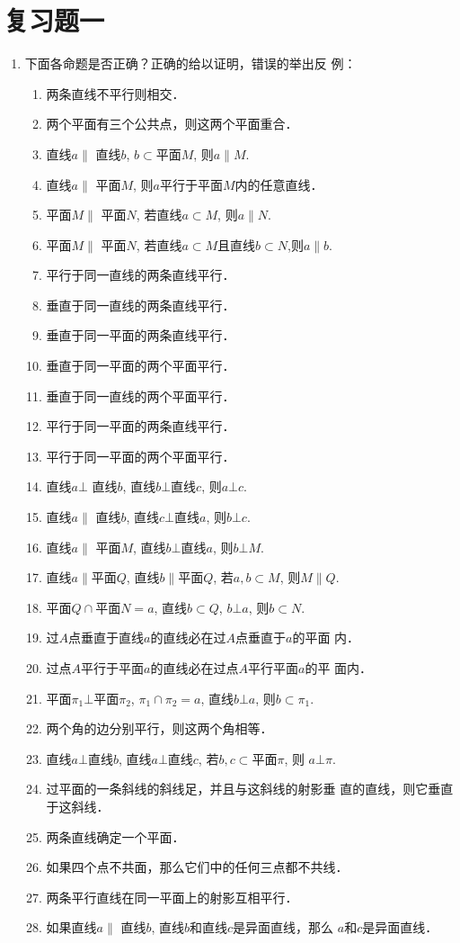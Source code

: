 \section*{复习题一}

\begin{enumerate}
    \item 下面各命题是否正确？正确的给以证明，错误的举出反
    例：
\begin{enumerate}[(1)]
\item 两条直线不平行则相交．
\item 两个平面有三个公共点，则这两个平面重合．
\item 直线$a\parallel$ 直线$b$, $b\subset$平面$M$, 则$a\parallel M$.
\item 直线$a\parallel$ 平面$M$, 则$a$平行于平面$M$内的任意直线．
\item 平面$M\parallel$ 平面$N$, 若直线$a\subset M$, 则$a\parallel N$.
\item 平面$M\parallel$ 平面$N$, 若直线$a\subset M$且直线$b\subset N$,则$a\parallel b$.
\item 平行于同一直线的两条直线平行．
\item 垂直于同一直线的两条直线平行．
\item 垂直于同一平面的两条直线平行．
\item 垂直于同一平面的两个平面平行．
\item 垂直于同一直线的两个平面平行．
\item 平行于同一平面的两条直线平行．
\item 平行于同一平面的两个平面平行．
\item 直线$a\bot$ 直线$b$, 直线$b\bot $直线$c$, 则$a\bot c$.
\item 直线$a\parallel$ 直线$b$, 直线$c\bot $直线$a$, 则$b\bot c$.
\item 直线$a\parallel$ 平面$M$, 直线$b\bot $直线$a$, 则$b\bot M$.
\item 直线$a\parallel $平面$Q$, 直线$b\parallel $平面$Q$, 若$a,b\subset M$, 则$M\parallel Q$.
\item 平面$Q\cap $平面$N=a$, 直线$b\subset Q$, $b\bot a$, 则$b\subset N$.
\item 过$A$点垂直于直线$a$的直线必在过$A$点垂直于$a$的平面
内．
\item 过点$A$平行于平面$a$的直线必在过点$A$平行平面$a$的平
面内．
\item 平面$\pi_1\bot $平面$\pi_2$, $\pi_1\cap \pi_2=a$, 直线$b\bot a$, 则$b\subset \pi_1$.
\item 两个角的边分别平行，则这两个角相等．
\item 直线$a\bot $直线$b$, 直线$a\bot $直线$c$, 若$b,c\subset $平面$\pi$, 则
$a\bot \pi$.
\item 过平面的一条斜线的斜线足，并且与这斜线的射影垂
直的直线，则它垂直于这斜线．
\item 两条直线确定一个平面．
\item 如果四个点不共面，那么它们中的任何三点都不共线．
\item 两条平行直线在同一平面上的射影互相平行．
\item 如果直线$a\parallel$ 直线$b$, 直线$b$和直线$c$是异面直线，那么
$a$和$c$是异面直线．
\end{enumerate}


\end{enumerate}
